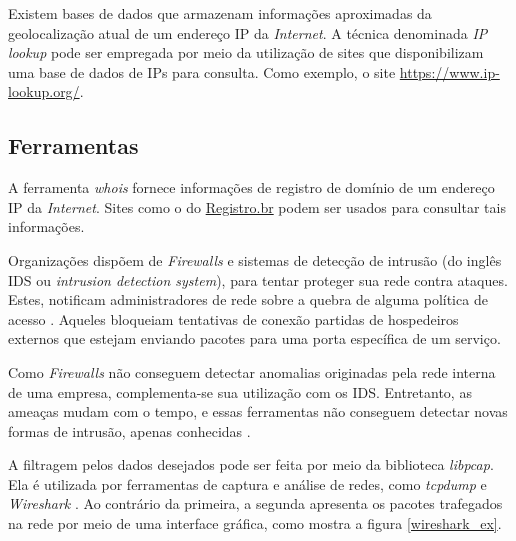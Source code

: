     \hspace{1cm}
    Existem bases de dados que armazenam informações aproximadas da geolocalização atual de um endereço IP da \textit{Internet}. A técnica denominada \textit{IP lookup} pode ser empregada por meio da utilização de sites que disponibilizam uma base de dados de IPs para consulta. Como exemplo, o site \href{https://www.ip-lookup.org/}{https://www.ip-lookup.org/}. 
    
    \subsection{Ferramentas} \label{cap4_ferramentas}

    \hspace{1cm}
    A ferramenta \textit{whois} fornece informações de registro de domínio de um endereço IP da \textit{Internet}. Sites como o do \href{https://registro.br/tecnologia/ferramentas/whois/}{Registro.br} podem ser usados para consultar tais informações.

    \vspace{4mm}

    \hspace{1cm}
    Organizações dispõem de \textit{Firewalls} e sistemas de detecção de intrusão (do inglês IDS ou \textit{intrusion detection system}), para tentar proteger sua rede contra ataques. Estes, notificam administradores de rede sobre a quebra de alguma política de acesso \cite{bejtlich2004}. Aqueles bloqueiam tentativas de conexão partidas de hospedeiros externos que estejam enviando pacotes para uma porta específica de um serviço.
    
    \vspace{4mm}
    
    \hspace{1cm}
    Como \textit{Firewalls} não conseguem detectar anomalias originadas pela rede interna de uma empresa, complementa-se sua utilização com os IDS. Entretanto, as ameaças mudam com o tempo, e essas ferramentas não conseguem detectar novas formas de intrusão, apenas conhecidas \cite{capobianco2019}.

    \vspace{4mm}

    \hspace{1cm}
    A filtragem pelos dados desejados pode ser feita por meio da biblioteca \textit{libpcap}. Ela é utilizada por ferramentas de captura e análise de redes, como \textit{tcpdump} e \textit{Wireshark} \cite{bejtlich2004}. Ao contrário da primeira, a segunda apresenta os pacotes trafegados na rede por meio de uma interface gráfica, como mostra a figura \ref{wireshark_ex}. 
    
